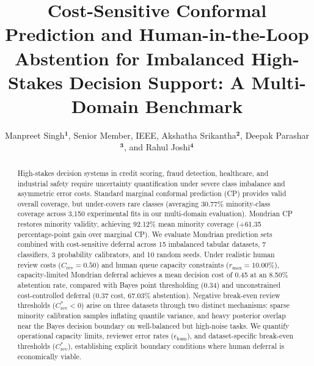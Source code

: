 \documentclass{ieeetj}
\def\authorrefmark#1{\ensuremath{^{\textbf{#1}}}}
\begin{document}



\title{Cost-Sensitive Conformal Prediction and Human-in-the-Loop Abstention for Imbalanced High-Stakes Decision Support: A Multi-Domain Benchmark}

\author{Manpreet Singh\authorrefmark{1}, Senior Member, IEEE, Akshatha Srikantha\authorrefmark{2}, Deepak Parashar\authorrefmark{3}, and Rahul Joshi\authorrefmark{4}}

\begin{abstract}
High-stakes decision systems in credit scoring, fraud detection, healthcare, and industrial safety require uncertainty quantification under severe class imbalance and asymmetric error costs. Standard marginal conformal prediction (CP) provides valid overall coverage, but under-covers rare classes (averaging 30.77\% minority-class coverage across 3,150 experimental fits in our multi-domain evaluation). Mondrian CP restores minority validity, achieving 92.12\% mean minority coverage (+61.35 percentage-point gain over marginal CP). We evaluate Mondrian prediction sets combined with cost-sensitive deferral across 15 imbalanced tabular datasets, 7 classifiers, 3 probability calibrators, and 10 random seeds. Under realistic human review costs ($C_{\mathrm{rev}}=0.50$) and human queue capacity constraints ($r_{\max}=10.00\%$), capacity-limited Mondrian deferral achieves a mean decision cost of 0.45 at an 8.50\% abstention rate, compared with Bayes point thresholding (0.34) and unconstrained cost-controlled deferral (0.37 cost, 67.03\% abstention). Negative break-even review thresholds ($C_{\mathrm{rev}}^* < 0$) arise on three datasets through two distinct mechanisms: sparse minority calibration samples inflating quantile variance, and heavy posterior overlap near the Bayes decision boundary on well-balanced but high-noise tasks. We quantify operational capacity limits, reviewer error rates ($\epsilon_{\mathrm{hum}}$), and dataset-specific break-even thresholds ($C_{\mathrm{rev}}^*$), establishing explicit boundary conditions where human deferral is economically viable.
\end{abstract}
\end{document}
